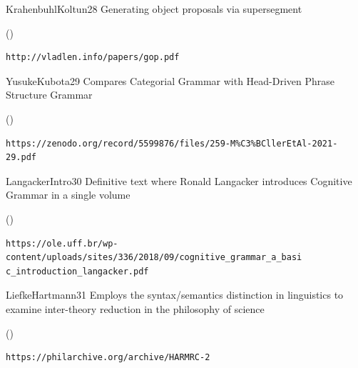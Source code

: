 \begin{bsuppItem}{KrahenbuhlKoltun}{28}
{Generating object proposals via supersegment }
\begin{lboxurl}(\currhref)
\begin{lstlisting}
http://vladlen.info/papers/gop.pdf
\end{lstlisting}
\end{lboxurl}
\end{bsuppItem}

\begin{bsuppItem}{YusukeKubota}{29}
{Compares Categorial Grammar with Head-Driven Phrase Structure Grammar}
\begin{lboxurl}(\currhref)
\begin{lstlisting}
https://zenodo.org/record/5599876/files/259-M%C3%BCllerEtAl-2021-29.pdf
\end{lstlisting}
\end{lboxurl}
\end{bsuppItem}

\begin{bsuppItem}{LangackerIntro}{30}
{Definitive text where Ronald Langacker 
introduces Cognitive Grammar in a single volume}
\begin{lboxurl}(\currhref)
\begin{lstlisting}
https://ole.uff.br/wp-content/uploads/sites/336/2018/09/cognitive_grammar_a_basi
c_introduction_langacker.pdf
\end{lstlisting}
\end{lboxurl}
\end{bsuppItem}

\clearpage{}\thispagestyle{empty}

\begin{bsuppItem}{LiefkeHartmann}{31}
{Employs the syntax/semantics distinction in linguistics 
to examine inter-theory reduction in the philosophy of science}
\begin{lboxurl}(\currhref)
\begin{lstlisting}
https://philarchive.org/archive/HARMRC-2
\end{lstlisting}
\end{lboxurl}
\end{bsuppItem}

